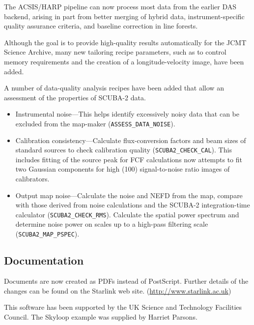 \documentclass[11pt,twoside]{article}
\begin{document}
The ACSIS/HARP pipeline can now process most data from the earlier DAS
backend, arising in part from better merging of hybrid data,
instrument-specific quality assurance criteria, and baseline
correction in line forests.

Although the goal is to provide high-quality results automatically for
the JCMT Science Archive, many new tailoring recipe parameters, such
as to control memory requirements and the creation of a
longitude-velocity image, have been added.


A number of data-quality analysis recipes have been added that allow
an assessment of the properties of SCUBA-2 data.
\begin{itemize}
\item Instrumental noise---This helps identify excessively noisy data that
can be excluded from the map-maker (\texttt{ASSESS\_DATA\_NOISE}).
\item Calibration consistency---Calculate flux-conversion factors and beam
sizes of standard sources to check calibration quality
(\texttt{SCUBA2\_CHECK\_CAL}).  This includes fitting of the source peak
for FCF calculations now attempts to fit two Gaussian components for high
(100) signal-to-noise ratio images of calibrators.
\item Output map noise---Calculate the noise and NEFD from the map,
compare with those derived from noise calculations and the SCUBA-2
integration-time calculator (\texttt{SCUBA2\_CHECK\_RMS}).  Calculate
the spatial power spectrum and determine noise power on scales up to a
high-pass filtering scale (\texttt{SCUBA2\_MAP\_PSPEC}).
\end{itemize}

\subsection*{Documentation}

Documents are now created as PDFs instead of PostScript.
Further details of the changes can be found on the Starlink
web site. (\url{http://www.starlink.ac.uk})

\acknowledgments This software has been supported by the UK Science
and Technology Facilities Council.  The Skyloop example was supplied
by Harriet Parsons.


\end{document}
